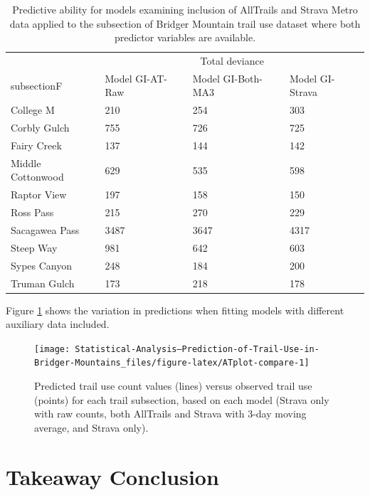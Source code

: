 \documentclass[
]{book}
\begin{document}
\begin{table}

\caption{\label{tab:ATdeviance-kable}Predictive ability for models examining inclusion of AllTrails and Strava Metro data applied to the subsection of Bridger Mountain trail use dataset where both predictor variables are available.}
\centering
\begin{tabular}[t]{llll}
\toprule
\multicolumn{1}{c}{ } & \multicolumn{3}{c}{Total deviance} \\
\cmidrule(l{3pt}r{3pt}){2-4}
subsectionF & Model GI-AT-Raw & Model GI-Both-MA3 & Model GI-Strava\\
\midrule
College M & 210 & 254 & 303\\
Corbly Gulch & 755 & 726 & 725\\
Fairy Creek & 137 & 144 & 142\\
Middle Cottonwood & 629 & 535 & 598\\
Raptor View & 197 & 158 & 150\\
\addlinespace
Ross Pass & 215 & 270 & 229\\
Sacagawea Pass & 3487 & 3647 & 4317\\
Steep Way & 981 & 642 & 603\\
Sypes Canyon & 248 & 184 & 200\\
Truman Gulch & 173 & 218 & 178\\
\bottomrule
\end{tabular}
\end{table}

Figure \ref{fig:ATplot-compare} shows the variation in predictions when fitting models with different auxiliary data included.

\begin{figure}

{\centering \texttt{[image: Statistical-Analysis--Prediction-of-Trail-Use-in-Bridger-Mountains\_files/figure-latex/ATplot-compare-1]} 

}

\caption{Predicted trail use count values (lines) versus observed trail use (points) for each trail subsection, based on each model (Strava only with raw counts, both AllTrails and Strava with 3-day moving average, and Strava only).}\label{fig:ATplot-compare}
\end{figure}

\hypertarget{takeaway-conclusion}{%
\section{Takeaway Conclusion}\label{takeaway-conclusion}}
\end{document}
